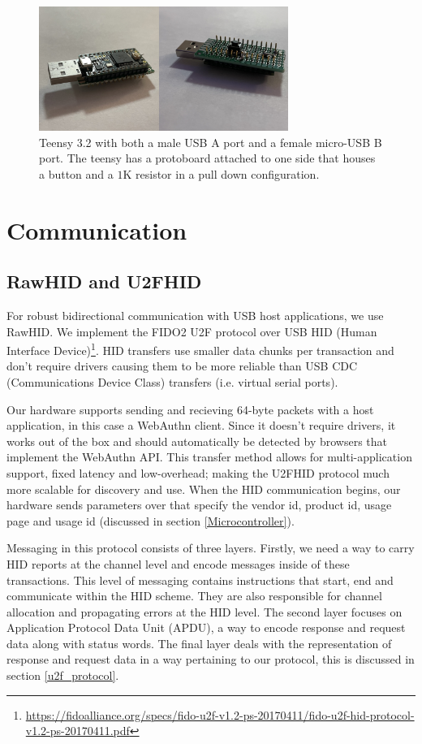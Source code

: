 \documentclass[acmtog,review]{acmart}
\begin{document}
\begin{figure}
    \centering
    \includegraphics[width=3.2in]{hardware_key.jpeg}
    \caption{Teensy 3.2 with both a male USB A port and a female micro-USB B port. The teensy has a protoboard attached to one side that houses a button and a $1$K resistor in a pull down configuration.}
    \label{fig:device}
\end{figure}



\section{Communication}
\label{comm}

\subsection{RawHID and U2FHID}

For robust bidirectional communication with USB host applications, we use 
RawHID. We implement the FIDO2 U2F protocol over USB HID (Human Interface Device)\footnote{\url{https://fidoalliance.org/specs/fido-u2f-v1.2-ps-20170411/fido-u2f-hid-protocol-v1.2-ps-20170411.pdf}}.
HID transfers use smaller data chunks per transaction and don't require drivers
causing them to be more reliable than USB CDC (Communications Device Class) 
transfers (i.e. virtual serial ports).

Our hardware supports sending and recieving 64-byte packets with a host application,
in this case a WebAuthn client. Since it doesn't require drivers, it works out of the
box and should automatically be detected by browsers that implement the WebAuthn API.
This transfer method allows for multi-application support, fixed latency and low-overhead;
making the U2FHID protocol much more scalable for discovery and use.
When the HID communication begins, our hardware sends parameters over that specify
the vendor id, product id, usage page and usage id (discussed in section \ref{Microcontroller}).

Messaging in this protocol consists of three layers. Firstly, we need a way to carry
HID reports at the channel level and encode messages inside of these transactions. 
This level of messaging contains instructions that start, end and communicate within the HID scheme. They are also responsible for channel allocation and propagating errors at the HID level. The second layer
focuses on Application Protocol Data Unit (APDU), a way to encode response and request
data along with status words. The final layer deals with the representation of response
and request data in a way pertaining to our protocol, this is discussed in section \ref{u2f_protocol}.
\end{document}
